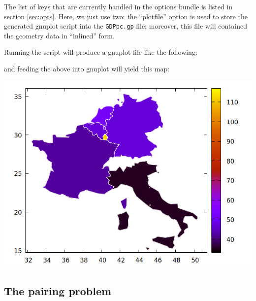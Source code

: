 \documentclass{article}
\begin{document}
The list of keys that are currently handled in the options bundle is
listed in section \ref{sec:opts}. Here, we just use two: the
``plotfile'' option is used to store the generated gnuplot script into
the \texttt{GDPpc.gp} file; moreover, this file will contained the
geometry data in ``inlined'' form.

Running the script will produce a gnuplot file like the following:


and feeding the above into gnuplot will yield  this map:

\begin{center}
  \includegraphics[scale=0.5]{GDPpc.png}
\end{center}

\subsection{The pairing problem}
\label{sec:pairing}
\end{document}
